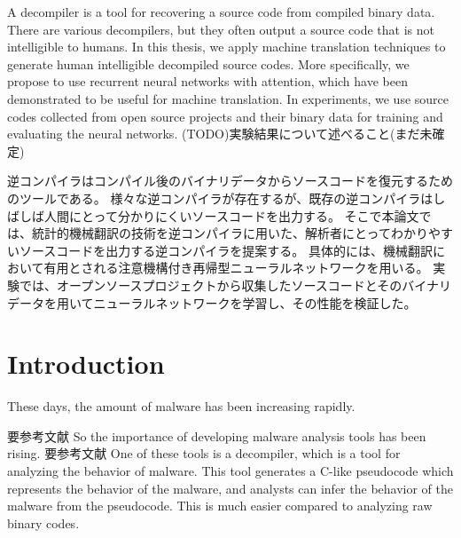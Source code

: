 \documentclass[senior,final,11pt]{iscs-thesis}
\date{December 11, 2018}
\begin{document}
\begin{eabstract}
A decompiler is a tool for recovering a source code from compiled binary data.
There are various decompilers, but they often output a source code that is not intelligible to humans. 
In this thesis, we apply machine translation techniques to generate human intelligible decompiled source codes. 
More specifically, we propose to use recurrent neural networks with attention, 
which have been demonstrated to be useful for machine translation. 
In experiments, we use source codes collected from open source projects and their binary data for training and evaluating the neural networks.
(TODO)実験結果について述べること(まだ未確定)
\end{eabstract}
\begin{jabstract}
逆コンパイラはコンパイル後のバイナリデータからソースコードを復元するためのツールである。
様々な逆コンパイラが存在するが、既存の逆コンパイラはしばしば人間にとって分かりにくいソースコードを出力する。
そこで本論文では、統計的機械翻訳の技術を逆コンパイラに用いた、解析者にとってわかりやすいソースコードを出力する逆コンパイラを提案する。
具体的には、機械翻訳において有用とされる注意機構付き再帰型ニューラルネットワークを用いる。
実験では、オープンソースプロジェクトから収集したソースコードとそのバイナリデータを用いてニューラルネットワークを学習し、その性能を検証した。
\end{jabstract}

\maketitle

\chapter{Introduction}

These days, the amount of malware has been increasing rapidly.

要参考文献
So the importance of developing malware analysis tools has been rising.
要参考文献
One of these tools is a decompiler, which is a tool for analyzing the behavior of malware. 
This tool generates a C-like pseudocode which represents the behavior of the malware, and analysts can infer the behavior of the malware from the pseudocode.
This is much easier compared to analyzing raw binary codes.
\end{document}
